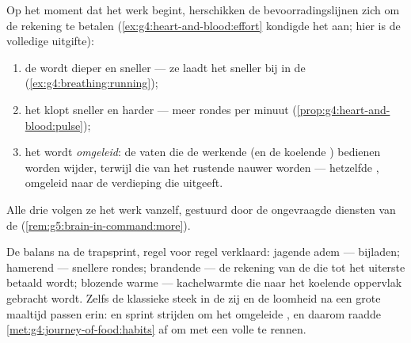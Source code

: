 \begin{proposition}\label{prop:g7:organs-at-work:supply}
Op het moment dat het werk begint, herschikken de bevoorradingslijnen zich
om de rekening te betalen (\cref{ex:g4:heart-and-blood:effort} kondigde het
aan; hier is de volledige uitgifte):
\begin{enumerate}
  \item de \emph{} wordt dieper en sneller --- ze laadt het
         sneller bij in de 
        (\cref{ex:g4:breathing:running});
  \item het \emph{} klopt sneller en harder --- meer rondes per
        minuut (\cref{prop:g4:heart-and-blood:pulse});
  \item het  wordt \emph{omgeleid}: de vaten die de werkende 
        (en de koelende ) bedienen worden wijder, terwijl die van het
        rustende  nauwer worden --- hetzelfde ,
        omgeleid naar de verdieping die uitgeeft.
\end{enumerate}
Alle drie volgen ze het werk vanzelf, gestuurd door de ongevraagde
diensten van de 
(\cref{rem:g5:brain-in-command:more}).
\end{proposition}
\admitted

\begin{example}\label{ex:g7:organs-at-work:felt}
De balans na de trapsprint, regel voor regel verklaard: jagende adem ---
bijladen; hamerend  --- snellere rondes; brandende  --- de
rekening van de  die tot het uiterste betaald wordt; blozende
warme  --- kachelwarmte die naar het koelende oppervlak gebracht
wordt. Zelfs de klassieke steek in de zij en de loomheid na een grote
maaltijd passen erin:  en sprint strijden om het omgeleide
, en daarom raadde
\cref{met:g4:journey-of-food:habits} af om met een volle  te rennen.
\end{example}

